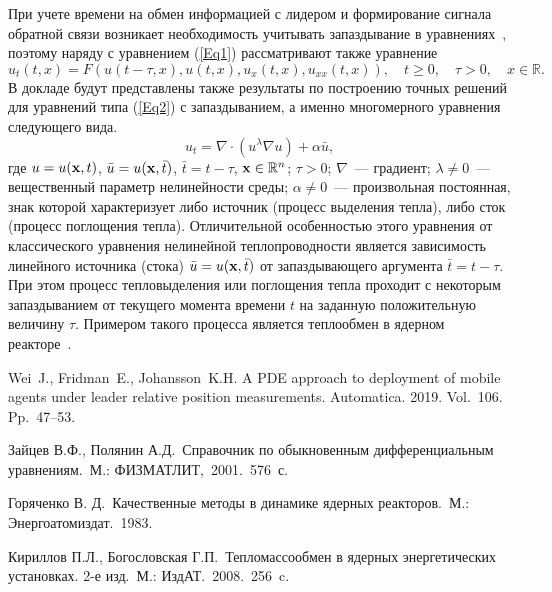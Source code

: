 При учете времени на обмен информацией с лидером и формирование сигнала обратной связи возникает необходимость учитывать запаздывание в уравнениях~\cite{wfj}, поэтому наряду с уравнением (\ref{Eq1}) рассматривают также уравнение
\begin{equation}\label{Eq2}
u_t(t,x)=F\left(u(t-\tau,x),u(t,x),u_{x}(t,x),u_{xx}(t,x)\right),\quad t\geq 0,\quad\tau>0,\quad x\in\mathbb{R}. 
\end{equation}
В докладе будут представлены также результаты по построению точных решений для уравнений типа (\ref{Eq2}) с запаздыванием, а именно многомерного уравнения следующего вида.
$$
u_{t}=\nabla\cdot\left(u^{\lambda}\nabla u\right)+\alpha\bar{u},
$$
где $u=u({\bf x},t)$, $\bar{u}=u({\bf x},\bar{t})$, $\bar{t}=t-\tau$, ${\bf x}\in\mathbb{R}^n$; $\tau>0$; $\nabla$~--- градиент; $\lambda\ne 0$~--- вещественный параметр нелинейности среды; $\alpha\ne 0$~--- произвольная постоянная, знак которой характеризует либо источник (процесс выделения тепла), либо сток (процесс поглощения тепла). Отличительной особенностью этого уравнения от классического уравнения нелинейной теплопроводности является зависимость линейного источника (стока) $\bar{u}=u({\bf x},\bar{t})$ от запаздывающего аргумента $\bar{t}=t-\tau$. При этом процесс тепловыделения или поглощения тепла проходит с некоторым запаздыванием от текущего момента времени $t$ на заданную положительную величину $\tau$. Примером такого процесса является теплообмен в ядерном реакторе~\cite{gor1988,kb2008}.

\begin{thebibliography}{9} %

  Wei~J., Fridman~E., Johansson~K.H. A PDE approach to deployment of mobile agents under leader relative position measurements. Automatica. 2019. Vol.~106. Pp.~47--53.

 Зайцев В.Ф., Полянин А.Д.~Справочник по обыкновенным дифференциальным
уравнениям.~М.: ФИЗМАТЛИТ,~2001.~576~с.

 Горяченко В. Д.~Качественные методы в динамике ядерных реакторов.~М.: Энергоатомиздат.~1983.

 Кириллов П.Л., Богословская Г.П.~Тепломассообмен в ядерных энергетических установках. 2-е изд.~М.: ИздАТ.~2008.~256~c.

\end{thebibliography}




%




